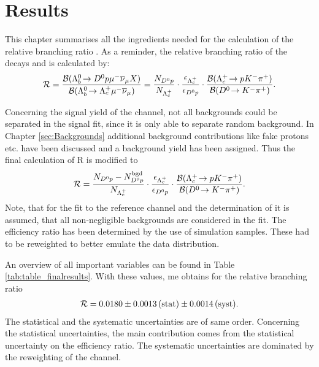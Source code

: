 \chapter{Results}
\label{sec:Results}
This chapter summarises all the ingredients needed for the calculation of the relative branching ratio \R.
As a reminder, the relative branching ratio of the decays \LbToDpmunuX and \LbToLcmunu is calculated by:
\begin{align}
	\mathcal{R} =
	\frac{{\cal B}({{\Lambda}^0_{b}}\!\rightarrow {\ensuremath{{D}^0}}{\ensuremath{p}} {\ensuremath{\mu^-}} {\ensuremath{{\overline{\nu}}_\mu}} X)}{{\cal B}({{\Lambda}^0_{b}}\!\rightarrow {\ensuremath{{\Lambda}^+_{c}}} {\ensuremath{\mu^-}}{\ensuremath{{\overline{\nu}}_\mu}})}
	 = 
	 \frac{N_{{{D}^0}{p}}}{N_{{{\Lambda}^+_{c}}}}  
	 \cdot \frac{\epsilon_{{{\Lambda}^+_{c}}}}{\epsilon_{{{D}^0}{p}}}
	 \cdot \frac{{\cal B}({{\Lambda}^+_{c}}\!\rightarrow p {{K}^-} {{\pi}^+})}{{\cal B}({{D}^0}\!\rightarrow {\ensuremath{{K}^-}}{\ensuremath{{\pi}^+}})}.
\end{align}

Concerning the signal yield \NDp of the \LbToDpmunuX channel, not all backgrounds could be separated in the signal fit, since it is only able to separate random background.
In Chapter \ref{sec:Backgrounds} additional background contributions like fake protons etc. have been discussed and a background yield \NBgdDp has been assigned.
Thus the final calculation of R is modified to
\begin{align}
	\mathcal{R} =
	 \frac{N_{{{D}^0}{p}}-N^{\rm bgd}_{{{D}^0}{p}}}{N_{{{\Lambda}^+_{c}}}}  
	 \cdot \frac{\epsilon_{{{\Lambda}^+_{c}}}}{\epsilon_{{{D}^0}{p}}}
	 \cdot \frac{{\cal B}({{\Lambda}^+_{c}}\!\rightarrow p {{K}^-} {{\pi}^+})}{{\cal B}({{D}^0}\!\rightarrow {\ensuremath{{K}^-}}{\ensuremath{{\pi}^+}})}. \label{eq:R_mod}
\end{align}
Note, that for the fit to the reference channel \LbToLcmunu and the determination of \NLc it is assumed, that all non-negligible backgrounds are considered in the fit.
The efficiency ratio \effRatio has been determined by the use of simulation samples.
These had to be reweighted to better emulate the data distribution.


An overview of all important variables can be found in Table \ref{tab:table_finalresults}.
With these values, me obtains for the relative branching ratio
\begin{align*}
    \mathcal{R} = 0.0180 \pm 0.0013\mathrm{\,(stat)} \pm 0.0014\mathrm{\,(syst)}.
\end{align*}
The statistical and the systematic uncertainties are of same order.
Concerning the statistical uncertainties, the main contribution comes from the statistical uncertainty on the efficiency ratio.
The systematic uncertainties are dominated by the reweighting of the \LbToDpmunu channel.

